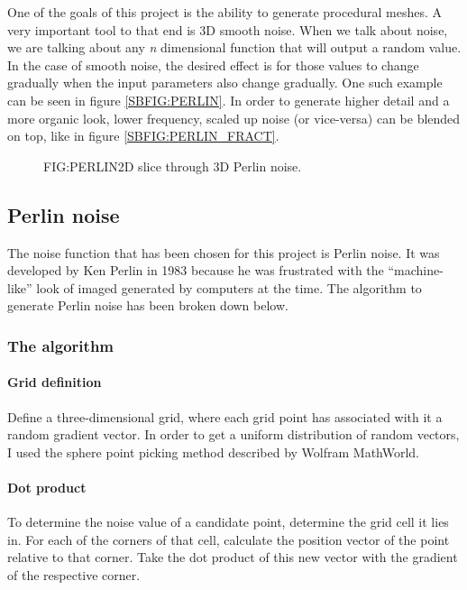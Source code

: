 One of the goals of this project is the ability to generate procedural meshes.
A very important tool to that end is 3D smooth noise.
When we talk about noise,
we are talking about any \textit{n} dimensional function that will output a random value.
In the case of smooth noise,
the desired effect is for those values to change gradually when the input parameters also change gradually.
One such example can be seen in figure \ref{SBFIG:PERLIN}.
In order to generate higher detail and a more organic look,
lower frequency, scaled up noise (or vice-versa) can be blended on top,
like in figure \ref{SBFIG:PERLIN_FRACT}.

\begin{figure}[Perlin noise example]{FIG:PERLIN}{2D slice through 3D Perlin noise.}
\end{figure}

\subsection{Perlin noise}


The noise function that has been chosen for this project is Perlin noise.
It was developed by Ken Perlin in 1983 because he was frustrated with the ``machine-like'' look of imaged generated by computers at the time.\cite{making_noise}
The algorithm to generate Perlin noise has been broken down below.

\subsubsection{The algorithm}

\paragraph{Grid definition}
Define a three-dimensional grid,
where each grid point has associated with it a random gradient vector.
In order to get a uniform distribution of random vectors,
I used the sphere point picking method described by Wolfram MathWorld\cite{sphere_point}.

\paragraph{Dot product}
To determine the noise value of a candidate point,
determine the grid cell it lies in.
For each of the corners of that cell,
calculate the position vector of the point relative to that corner.
Take the dot product of this new vector with the gradient of the respective corner.

